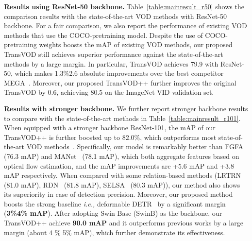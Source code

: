 \documentclass[10pt,journal,compsoc]{IEEEtran}
\begin{document}
\noindent
\textbf{Results using ResNet-50 backbone.}
Table~\ref{table:mainresult_r50} shows the comparison results with the state-of-the-art VOD methods with ResNet-50 backbone.
For a fair comparison, we also report the performance of existing VOD methods that use the COCO-pretraining model.
Despite the use of COCO-pretraining weights boosts the mAP of existing VOD methods, our proposed TransVOD still achieves superior performance against the state-of-the-art methods by a large margin. 
In particular, TransVOD achieves 79.9 with ResNet-50, which makes 1.3\%2.6 absolute improvements over the best competitor MEGA~\cite{chen2020memory}. Moreover, our proposed TransVOD++ further improves the original TransVOD by 0.6, achieving 80.5 on the ImageNet VID validation set.


\noindent
\textbf{Results with stronger backbone.} We further report stronger backbone results to compare with the state-of-the-art methods in Table~\ref{table:mainresult_r101}. When equipped with a stronger backbone ResNet-101, the mAP of our TransVOD++ is further boosted up to 82.0\%, which outperforms most state-of-the-art VOD methods~\cite{zhu17dff,feichtenhofer17dt,zhu17fgfa,wang18manet,zhu18hp}. Specifically, our model is remarkably better than FGFA~\cite{zhu17fgfa} (76.3 mAP) and MANet~\cite{wang18manet} (78.1 mAP), which both aggregate features based on optical flow estimation, and the mAP improvements are +5.6 mAP and +3.8 mAP respectively. When compared with some relation-based methods
(LRTRN~\cite{shvets19lltr} (81.0 mAP), RDN~\cite{deng19rdn} (81.8 mAP), SELSA~\cite{wu19selsa}  (80.3  mAP)), our method also shows its superiority in case of detection precision.
Moreover, our proposed method boosts the strong baseline \emph{i.e.,} deformable DETR~\cite{zhu2020deformable} by a significant margin (\textbf{3\%4\% mAP}). After adopting Swin Base (SwinB) as the backbone, our TransVOD++ achieve \textbf{90.0 mAP} and it outperforms previous works by a large margin (about 4 \% 5\% mAP), which further demonstrate its effectiveness. 
\end{document}
